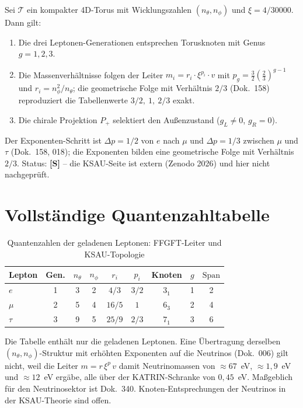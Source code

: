 \begin{keyresult}
Sei $\mathcal{T}$ ein kompakter 4D-Torus mit Wicklungszahlen
$(n_\theta, n_\phi)$ und $\xi = 4/30000$. Dann gilt:
\begin{enumerate}
  \item Die drei Leptonen-Generationen entsprechen Torusknoten mit
    Genus $g = 1, 2, 3$.
  \item Die Massenverhältnisse folgen der Leiter $m_i = r_i \cdot
    \xi^{p_i} \cdot v$ mit $p_g = \frac{3}{2}\left(\frac{2}{3}\right)^{g-1}$
    und $r_i = n_\phi^2/n_\theta$; die geometrische Folge mit
    Verhältnis $2/3$ (Dok.~158) reproduziert die Tabellenwerte
    $3/2,\ 1,\ 2/3$ exakt.
  \item Die chirale Projektion $P_+$ selektiert den Außenzustand
    ($g_L \neq 0$, $g_R = 0$).
\end{enumerate}
Der Exponenten-Schritt ist $\Delta p = 1/2$ von $e$ nach $\mu$ und
$\Delta p = 1/3$ zwischen $\mu$ und $\tau$ (Dok.~158, 018); die Exponenten
bilden eine geometrische Folge mit Verhältnis $2/3$. Status: \textbf{[S]} --
die KSAU-Seite ist extern (Zenodo 2026) und hier nicht nachgeprüft.
\end{keyresult}

\section{Vollständige Quantenzahltabelle}

\begin{table}[h]
\centering
\caption{Quantenzahlen der geladenen Leptonen: FFGFT-Leiter und KSAU-Topologie}
\label{tab:vollstaendig}
\begin{tabular}{lcccccccc}
\toprule
Lepton & Gen. & $n_\theta$ & $n_\phi$ & $r_i$ & $p_i$ &
  Knoten & $g$ & $\text{Span}$ \\
\midrule
$e$   & 1 & 3 & 2 & $4/3$  & $3/2$ & $3_1$ & 1 & 2 \\
$\mu$ & 2 & 5 & 4 & $16/5$ & $1$   & $6_3$ & 2 & 4 \\
$\tau$& 3 & 9 & 5 & $25/9$ & $2/3$ & $7_1$ & 3 & 6 \\
\bottomrule
\end{tabular}
\end{table}

Die Tabelle enthält nur die geladenen Leptonen. Eine Übertragung
derselben $(n_\theta, n_\phi)$-Struktur mit erhöhten Exponenten auf die
Neutrinos (Dok.~006) gilt nicht, weil die Leiter $m = r\,\xi^{p}\,v$ damit
Neutrinomassen von $\approx 67$~eV, $\approx 1{,}9$~eV und $\approx 12$~eV
ergäbe, alle über der KATRIN-Schranke von $0{,}45$~eV. Maßgeblich für den
Neutrinosektor ist Dok.~340. Knoten-Entsprechungen der Neutrinos in der
KSAU-Theorie sind offen.

